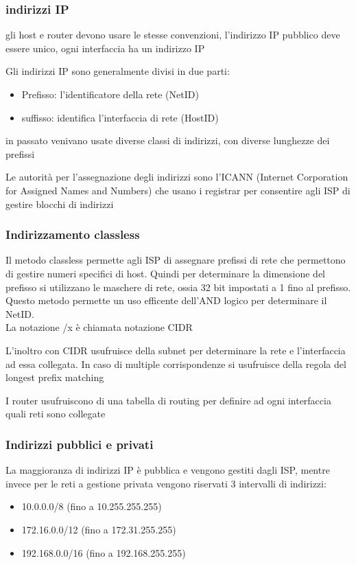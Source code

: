 \documentclass[12pt, a4paper]{article}
\begin{document}
\subsubsection{indirizzi IP}
gli host e router devono usare le stesse convenzioni, l'indirizzo IP pubblico deve essere unico, ogni
interfaccia ha un indirizzo IP

Gli indirizzi IP sono generalmente divisi in due parti: 
\begin{itemize}
    \item Prefisso: l'identificatore della rete (NetID)
    \item suffisso: identifica l'interfaccia di rete (HostID)
\end{itemize}
in passato venivano usate diverse classi di indirizzi, con diverse lunghezze dei prefissi

Le autorità per l'assegnazione degli indirizzi sono l'ICANN (Internet Corporation for Assigned Names and Numbers)
che usano i registrar per consentire agli ISP di gestire blocchi di indirizzi

\subsubsection{Indirizzamento classless}
Il metodo classless permette agli ISP di assegnare prefissi di rete che permettono di gestire numeri specifici 
di host. Quindi per determinare la dimensione del prefisso si utilizzano le maschere di rete, ossia 32 bit 
impostati a 1 fino al prefisso. Questo metodo permette un uso efficente dell'AND logico per determinare il NetID.
\\La notazione /x è chiamata notazione CIDR

L'inoltro con CIDR usufruisce della subnet per determinare la rete e l'interfaccia ad essa collegata. In caso 
di multiple corrispondenze si usufruisce della regola del longest prefix matching

I router usufruiscono di una tabella di routing per definire ad ogni interfaccia quali reti sono collegate

\subsubsection{Indirizzi pubblici e privati}
La maggioranza di indirizzi IP è pubblica e vengono gestiti dagli ISP, mentre invece per le reti a gestione 
privata vengono riservati 3 intervalli di indirizzi:
\begin{itemize}
    \item 10.0.0.0/8 (fino a 10.255.255.255)
    \item 172.16.0.0/12 (fino a 172.31.255.255)
    \item 192.168.0.0/16 (fino a 192.168.255.255)
\end{itemize}
\end{document}
